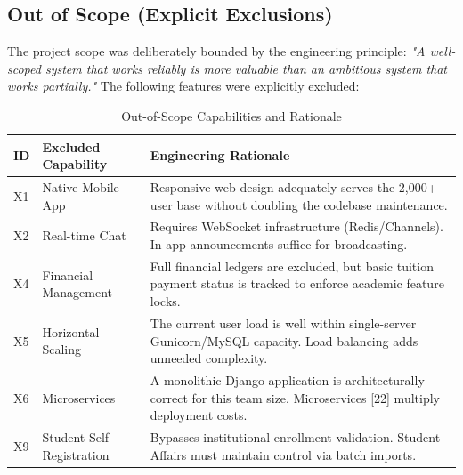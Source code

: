 \newpage
\subsection{Out of Scope (Explicit Exclusions)}

The project scope was deliberately bounded by the engineering principle: \textit{"A well-scoped system that works reliably is more valuable than an ambitious system that works partially."} The following features were explicitly excluded:

\begin{table}[H]
    \centering
    \renewcommand{\arraystretch}{1.2}
    \begin{tabular}{|p{}|p{}|p{}|}
        \hline
        \textbf{ID} & \textbf{Excluded Capability} & \textbf{Engineering Rationale} \\
        \hline
        X1 & Native Mobile App & Responsive web design adequately serves the 2,000+ user base without doubling the codebase maintenance. \\
        \hline
        X2 & Real-time Chat & Requires WebSocket infrastructure (Redis/Channels). In-app announcements suffice for broadcasting. \\
        \hline
        X4 & Financial Management & Full financial ledgers are excluded, but basic tuition payment status is tracked to enforce academic feature locks. \\
        \hline
        X5 & Horizontal Scaling & The current user load is well within single-server Gunicorn/MySQL capacity. Load balancing adds unneeded complexity. \\
        \hline
        X6 & Microservices & A monolithic Django application is architecturally correct for this team size. Microservices [22] multiply deployment costs. \\
        \hline
        X9 & Student Self-Registration & Bypasses institutional enrollment validation. Student Affairs must maintain control via batch imports. \\
        \hline
    \end{tabular}
    \caption{Out-of-Scope Capabilities and Rationale}
    \label{tab:out_of_scope}
\end{table}